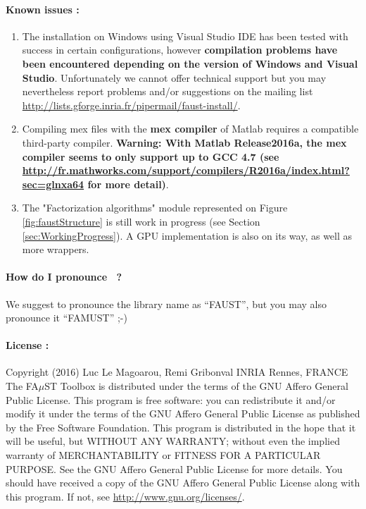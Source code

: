 \paragraph{Known issues :}
\begin{enumerate}
\item The installation on Windows using Visual Studio IDE has been tested with success in certain configurations, however \textbf{compilation problems have been encountered depending on the version of Windows and Visual Studio}. Unfortunately we cannot offer technical support but you may nevertheless report problems and/or suggestions on the mailing list \url{http://lists.gforge.inria.fr/pipermail/faust-install/}. 
 
\item Compiling mex files with the \textbf{mex compiler} of Matlab requires a compatible third-party compiler. \textbf{Warning: With  Matlab Release2016a, the mex compiler seems to only support up to GCC 4.7 (see \url{http://fr.mathworks.com/support/compilers/R2016a/index.html?sec=glnxa64} for more detail)}.

\item The "Factorization algorithms" module represented on Figure \ref{fig:faustStructure} is still work in progress (see Section \ref{sec:WorkingProgress}). A GPU implementation is also on its way, as well as more wrappers.

\end{enumerate}

\paragraph{How do I pronounce \FAuST\ ?} We suggest to pronounce the library name as ``FAUST'', but you may also pronounce it ``FAMUST'' ;-)


\paragraph{License :}Copyright (2016) Luc Le Magoarou, Remi Gribonval INRIA Rennes, FRANCE \\
The FA$\mu$ST Toolbox is distributed under the terms of the GNU Affero General Public License. This program is free software: you can redistribute it and/or modify it under the terms of the GNU Affero General Public License as published by the Free Software Foundation. This program is distributed in the hope that it will be useful, but WITHOUT ANY WARRANTY; without even the implied warranty of MERCHANTABILITY or FITNESS FOR A PARTICULAR PURPOSE.  See the GNU Affero General Public License for more details. You should have received a copy of the GNU Affero General Public License along with this program.  If not, see \url{http://www.gnu.org/licenses/}.
